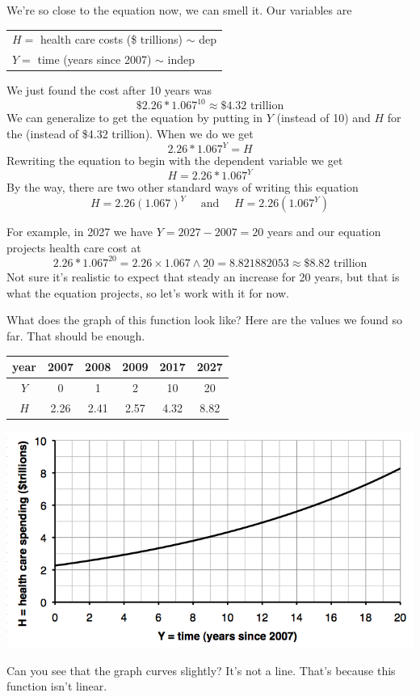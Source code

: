 We're so close to the equation now, we can smell it.   Our variables are 
\begin{center}
\begin{tabular} {l} 
$H=$ health care costs (\$ trillions) $\sim$ dep \\
$Y= $ time (years since 2007) $\sim$ indep \\ 
\end{tabular}
\end{center}We just found the cost after 10 years was 
$$\text{\$2.26}  \ast 1.067^{10}\approx \$4.32 \text{ trillion}$$  
We can generalize to get the equation by putting in $Y$  (instead of 10) and $H$ for the (instead of \$4.32 trillion).  When we do we get
$$\text{2.26}  \ast 1.067^{Y} = H$$ 
Rewriting the equation to begin with the dependent variable we get 
$$H = 2.26\ast 1.067^{Y}$$  
By the way, there are two other standard ways of writing this equation  
$$ H= 2.26(1.067)^{Y} \quad \text{ and } \quad H = 2.26\left(1.067^{Y}\right)$$

For example, in 2027 we have $Y=2027 - 2007 = 20$ years and our equation projects health care cost at 
$$2.26 \ast 1.067^{20} = 2.26 \times 1.067 \wedge \underline{20} = 8.821882053 \approx \$8.82 \text{ trillion}$$
Not sure it's realistic to expect that steady an increase for 20 years, but that is what the equation projects, so let's work with it for now.

What does the graph of this function look like?  Here are the values we found so far.  That should be enough.
\begin{center}
\begin{tabular} {|c| |c |c |c |c |c|}\hline
year & 2007 & 2008 & 2009 & 2017 & 2027 \\ \hline
$Y$ & 0 & 1 & 2 & 10 & 20 \\ \hline
$H$ & 2.26 & 2.41 & 2.57 & 4.32 & 8.82 \\ \hline
\end{tabular}
\end{center}

\begin{center}
 {\includegraphics [width = 6in] {healthcarecosts.png}}
\end{center}
Can you see that the graph curves slightly?  It's not a line.  That's because this function isn't linear.
 
